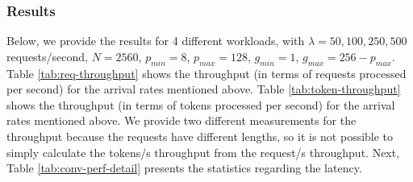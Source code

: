 \subsubsection{Results}
Below, we provide the results for 4 different workloads, with $\lambda = 50, 100, 250, 500$ requests/second, $N = 2560$, $p_{min} = 8$, $p_{max} = 128$, $g_{min} = 1 $, $g_{max} = 256 - p_{max}$. Table \ref{tab:req-throughput} shows the throughput (in terms of requests processed per second) for the arrival rates mentioned above. Table \ref{tab:token-throughput} shows the throughput (in terms of tokens processed per second) for the arrival rates mentioned above. We provide two different measurements for the throughput because the requests have different lengths, so it is not possible to simply calculate the tokens/s throughput from the request/s throughput. Next, Table \ref{tab:conv-perf-detail} presents the statistics regarding the latency.

\begin{table}[H]
\caption{Request serving throughput (requests/s) }
\label{tab:req-throughput}
\end{table}

\begin{table}[H]
\caption{Token generation throughput (token/s) }
\label{tab:token-throughput}
\end{table}

